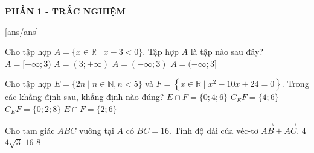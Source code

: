 \begin{center}
	\textbf{PHẦN 1 - TRẮC NGHIỆM}
\end{center}
[ans/ans]


\begin{ex}%
	Cho tập hợp $A=\{x\in \mathbb{R} \mid x-3<0\}$. Tập hợp $A$ là tập nào sau đây?
	\choice
	{$A=[-\infty; 3)$}
	{$A=(3;+\infty)$}
	{\True $A=(-\infty; 3)$}
	{$A=(-\infty; 3]$}
\end{ex}

\begin{ex}%
	Cho tập hợp $E=\{2n \mid n\in \mathbb{N}, n<5\}$ và $F=\left\{x\in \mathbb{R} \mid x^{2}-10x+24=0\right\}$. Trong các khẳng định sau, khẳng định nào đúng?
	\choice
	{$E \cap F=\{0; 4; 6\}$}
	{$C_{E} F=\{4; 6\}$}
	{\True $C_{E} F=\{0; 2; 8\}$}
	{$E \cap F=\{2; 6\}$}
\end{ex}

\begin{ex}%
	Cho tam giác $ABC$ vuông tại $A$ có $BC=16$. Tính độ dài của véc-tơ $\overrightarrow{AB}+\overrightarrow{AC}$.
	\choice
	{$4$}
	{$4\sqrt{3}$}
	{\True $16$}
	{$8$}
\end{ex}


